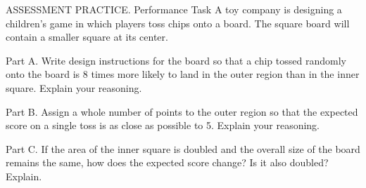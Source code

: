 \documentclass{article}
\newenvironment{practice}[2]{}{}        %
\newcommand{\answer}[1]{}               %
\newcommand{\placeholder}[2]{}          %
\newcommand{\te}[1]{}                   %
\begin{document}
\begin{practice}{27}{3}
ASSESSMENT PRACTICE. Performance Task A toy company is designing a children's game in which players toss chips onto a board. The square board will contain a smaller square at its center.
\placeholder{diagram}{Orange square board with centered darker orange smaller square rotated 45 degrees, labeled 20 points. No dimensions printed.}
Part A. Write design instructions for the board so that a chip tossed randomly onto the board is 8 times more likely to land in the outer region than in the inner square. Explain your reasoning.
\answer{Part A. Each side of the center square should be (\frac13) the side length of the large square. The ratio of the areas of the squares is 1 : 9, so the two regions have areas in the ratio 1 : 8.}
Part B. Assign a whole number of points to the outer region so that the expected score on a single toss is as close as possible to 5. Explain your reasoning.
\answer{Part B. 3 points; Let (x) be the point value in the outer region. The probability of a chip landing in the center square is (\frac19) while the probability of landing in the outer region is (\frac89). Since a chip in the center square is worth 20 points, the expected value is (\frac19(20)+\frac89(x)). For an expected value close to 5, solve this equation: (\frac19(20)+\frac89(x)=5), or (x=3.125). So, making the outer region worth 3 points solves the problem.}
Part C. If the area of the inner square is doubled and the overall size of the board remains the same, how does the expected score change? Is it also doubled? Explain.
\answer{Part C. The expected score is increased but not necessarily doubled. The amount of increase in the expected score depends on the point value of landing in each area.}
\te{Printed answer number 24; likely 27, the Performance Task. Student preview footer prints 540, teacher footer 622.}
\end{practice}
\end{document}

